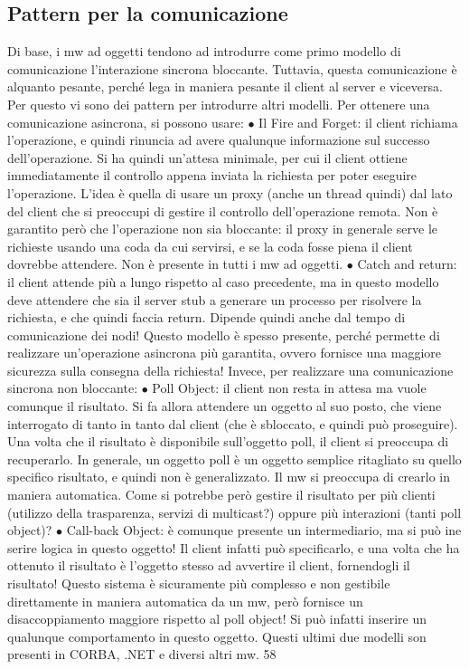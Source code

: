 \subsection{Pattern per la comunicazione}
Di base, i mw ad oggetti tendono ad introdurre come primo modello di comunicazione l'interazione sincrona bloccante.
Tuttavia, questa comunicazione è
alquanto pesante, perché lega in maniera pesante il client al server e viceversa.
Per questo vi sono dei pattern per introdurre altri modelli.
Per ottenere una comunicazione asincrona, si possono usare:
$\bullet$ Il Fire and Forget: il client richiama l'operazione, e quindi rinuncia ad
avere qualunque informazione sul successo dell'operazione. Si ha quindi
un'attesa minimale, per cui il client ottiene immediatamente il controllo
appena inviata la richiesta per poter eseguire l'operazione. L'idea è quella
di usare un proxy (anche un thread quindi) dal lato del client che si preoccupi di gestire il controllo dell'operazione
remota. Non è garantito però
che l'operazione non sia bloccante: il proxy in generale serve le richieste
usando una coda da cui servirsi, e se la coda fosse piena il client dovrebbe
attendere. Non è presente in tutti i mw ad oggetti.
$\bullet$ Catch and return: il client attende più a lungo rispetto al caso precedente,
ma in questo modello deve attendere che sia il server stub a generare un
processo per risolvere la richiesta, e che quindi faccia return. Dipende
quindi anche dal tempo di comunicazione dei nodi! Questo modello è
spesso presente, perché permette di realizzare un'operazione asincrona
più garantita, ovvero fornisce una maggiore sicurezza sulla consegna della
richiesta!
Invece, per realizzare una comunicazione sincrona non bloccante:
$\bullet$ Poll Object: il client non resta in attesa ma vuole comunque il risultato.
Si fa allora attendere un oggetto al suo posto, che viene interrogato di
tanto in tanto dal client (che è sbloccato, e quindi può proseguire). Una
volta che il risultato è disponibile sull'oggetto poll, il client si preoccupa
di recuperarlo.
In generale, un oggetto poll è un oggetto semplice ritagliato su quello
specifico risultato, e quindi non è generalizzato. Il mw si preoccupa di
crearlo in maniera automatica. Come si potrebbe però gestire il risultato
per più clienti (utilizzo della trasparenza, servizi di multicast?) oppure
più interazioni (tanti poll object)?
$\bullet$ Call-back Object: è comunque presente un intermediario, ma si può ine
serire logica in questo oggetto! Il client infatti può specificarlo, e una
volta che ha ottenuto il risultato è l'oggetto stesso ad avvertire il client,
fornendogli il risultato! Questo sistema è sicuramente più complesso e non
gestibile direttamente in maniera automatica da un mw, però fornisce un
disaccoppiamento maggiore rispetto al poll object! Si può infatti inserire
un qualunque comportamento in questo oggetto.
Questi ultimi due modelli son presenti in CORBA, .NET e diversi altri mw.
58
